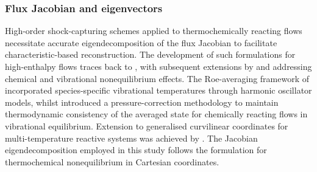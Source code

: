 \subsubsection{Flux Jacobian and eigenvectors}

High-order shock-capturing schemes applied to thermochemically reacting flows necessitate accurate eigendecomposition of the flux Jacobian to facilitate characteristic-based reconstruction. The development of such formulations for high-enthalpy flows traces back to \citet{Gnoffo1989}, with subsequent extensions by \citet{GrossmanCinnella1990} and \citet{ShuenEtAl1990} addressing chemical and vibrational nonequilibrium effects. The Roe-averaging framework of \citet{GrossmanCinnella1990} incorporated species-specific vibrational temperatures through harmonic oscillator models, whilst \citet{ShuenEtAl1990} introduced a pressure-correction methodology to maintain thermodynamic consistency of the averaged state for chemically reacting flows in vibrational equilibrium. Extension to generalised curvilinear coordinates for multi-temperature reactive systems was achieved by \citet{WangZhong2009}. The Jacobian eigendecomposition employed in this study follows the formulation for thermochemical nonequilibrium in Cartesian coordinates.

